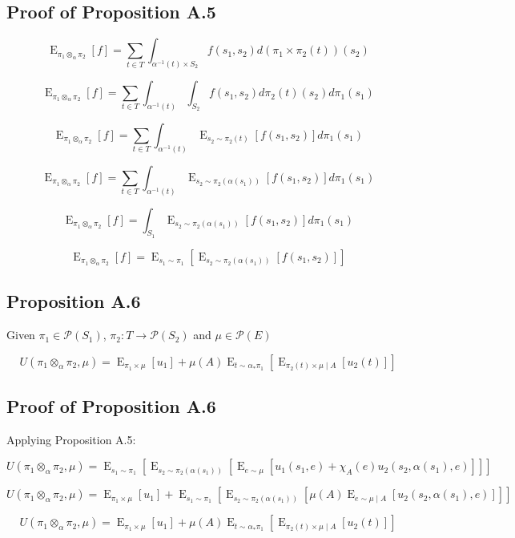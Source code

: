 \documentclass[a4paper]{article}
\DeclareMathOperator{\E}{E}
\newcommand{\Prob}{\mathcal{P}}
\begin{document}
\subsection{Proof of Proposition A.5}

$$\E_{\pi_1 \otimes_\alpha \pi_2}[f] = \sum_{t \in T} \int_{\alpha^{-1}(t) \times S_2} f(s_1, s_2) d(\pi_1 \times \pi_2(t))(s_2)$$

$$\E_{\pi_1 \otimes_\alpha \pi_2}[f] = \sum_{t \in T} \int_{\alpha^{-1}(t)} \int_{S_2} f(s_1, s_2) d\pi_2(t)(s_2) d\pi_1(s_1)$$

$$\E_{\pi_1 \otimes_\alpha \pi_2}[f] = \sum_{t \in T} \int_{\alpha^{-1}(t)} \E_{s_2 \sim \pi_2(t)}[f(s_1,s_2)] d\pi_1(s_1)$$

$$\E_{\pi_1 \otimes_\alpha \pi_2}[f] = \sum_{t \in T} \int_{\alpha^{-1}(t)} \E_{s_2 \sim \pi_2(\alpha(s_1))}[f(s_1,s_2)] d\pi_1(s_1)$$

$$\E_{\pi_1 \otimes_\alpha \pi_2}[f] = \int_{S_1} \E_{s_2 \sim \pi_2(\alpha(s_1))}[f(s_1,s_2)] d\pi_1(s_1)$$

$$\E_{\pi_1 \otimes_\alpha \pi_2}[f] = \E_{s_1 \sim \pi_1}[\E_{s_2 \sim \pi_2(\alpha(s_1))}[f(s_1, s_2)]]$$

\subsection{Proposition A.6}

Given ${\pi_1 \in \Prob(S_1)}$, ${\pi_2: T \rightarrow \Prob(S_2)}$ and ${\mu \in \Prob(E)}$

$$U(\pi_1 \otimes_\alpha \pi_2, \mu) = \E_{\pi_1 \times \mu}[u_1] + \mu(A) \E_{t \sim \alpha_*\pi_1}[\E_{\pi_2(t) \times \mu \mid A}[u_2(t)]]$$

\subsection{Proof of Proposition A.6}

Applying Proposition A.5:

$$U(\pi_1 \otimes_\alpha \pi_2, \mu) = \E_{s_1 \sim \pi_1}[\E_{s_2 \sim \pi_2(\alpha(s_1))}[\E_{e \sim \mu}[u_1(s_1,e)+\chi_A(e) u_2(s_2,\alpha(s_1),e)]]]$$

$$U(\pi_1 \otimes_\alpha \pi_2, \mu) = \E_{\pi_1 \times \mu}[u_1] + \E_{s_1 \sim \pi_1}[\E_{s_2 \sim \pi_2(\alpha(s_1))}[\mu(A) \E_{e \sim \mu \mid A}[u_2(s_2,\alpha(s_1),e)]]]$$

$$U(\pi_1 \otimes_\alpha \pi_2, \mu) = \E_{\pi_1 \times \mu}[u_1] + \mu(A) \E_{t \sim \alpha_*\pi_1}[\E_{\pi_2(t) \times \mu \mid A}[u_2(t)]]$$
\end{document}
